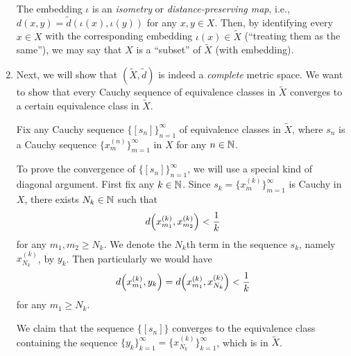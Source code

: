 \begin{enumerate}
The embedding \(\iota\) is an \emph{isometry} or \emph{distance-preserving
map}, i.e., \(d(x,y)=\widetilde{d}(\iota(x),\iota(y))\) for any \(x,y\in X\).
Then, by identifying every \(x\in X\) with the corresponding embedding
\(\iota(x)\in\widetilde{X}\) (``treating them as the same''), we may say that
\(X\) is a ``subset'' of \(\widetilde{X}\) (with embedding).

\item Next, we will show that \((\widetilde{X},\widetilde{d})\) is indeed a
\emph{complete} metric space. We want to show that every Cauchy sequence of
equivalence classes in \(\widetilde{X}\) converges to a certain equivalence class in
\(\widetilde{X}\).

Fix any Cauchy sequence \(\{[s_n]\}_{n=1}^{\infty}\) of equivalence classes in
\(\widetilde{X}\), where \(s_n\) is a Cauchy sequence
\(\{x_m^{(n)}\}_{m=1}^{\infty}\) in \(X\) for any \(n\in\mathbb{N}\).

To prove the convergence of \(\{[s_n]\}_{n=1}^{\infty}\), we will use a special
kind of diagonal argument.  First fix any \(k\in\mathbb{N}\). Since
\(s_k=\{x_m^{(k)}\}_{m=1}^{\infty}\) is Cauchy in \(X\), there exists
\(N_k\in\mathbb{N}\) such that
\[
d\qty(x_{m_1}^{(k)},x_{m_2}^{(k)})<\frac{1}{k}
\]
for any \(m_1,m_2\ge N_k\). We denote the \(N_k\)th term in the sequence
\(s_k\), namely \(x_{N_k}^{(k)}\), by \(y_k\). Then particularly we would have
\begin{equation}
\label{eq:completion-dxky}
d\qty(x_{m_1}^{(k)},y_k)=d\qty(x_{m_1}^{(k)},x_{N_k}^{(k)})<\frac{1}{k}
\end{equation}
for any \(m_1\ge N_k\).

We claim that the sequence \(\{[s_n]\}\) converges to the equivalence class
containing the sequence
\(\{y_k\}_{k=1}^{\infty}=\{x_{N_k}^{(k)}\}_{k=1}^{\infty}\), which is in \(\widetilde{X}\).


\end{enumerate}
